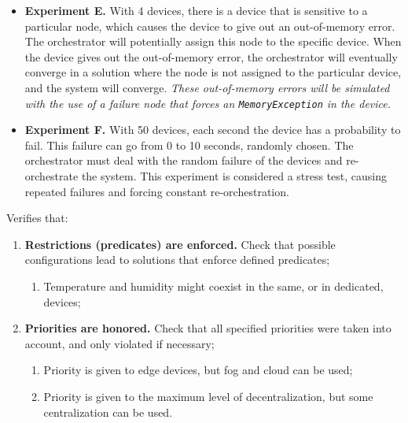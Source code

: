\begin{enumerate}
\begin{itemize}
            \item \textbf{Experiment E.} With 4 devices, there is a device that is sensitive to a particular node, which causes the device to give out an out-of-memory error. The orchestrator will potentially assign this node to the specific device. When the device gives out the out-of-memory error, the orchestrator will eventually converge in a solution where the node is not assigned to the particular device, and the system will converge.  \textit{These out-of-memory errors will be simulated with the use of a failure node that forces an \texttt{MemoryException} in the device.}
            \item \textbf{Experiment F.} With 50 devices, each second the device has a probability to fail. This failure can go from 0 to 10 seconds, randomly chosen. The orchestrator must deal with the random failure of the devices and re-orchestrate the system. This experiment is considered a stress test, causing repeated failures and forcing constant re-orchestration.
        \end{itemize}
        Verifies that:
        \begin{enumerate}
            \item \textbf{Restrictions (predicates) are enforced.} Check that possible configurations lead to solutions that enforce defined predicates;
                \begin{enumerate}
                    \item Temperature and humidity might coexist in the same, or in dedicated, devices;
                \end{enumerate}
            \item \textbf{Priorities are honored.} Check that all specified priorities were taken into account, and only violated if necessary;
                \begin{enumerate}
                    \item Priority is given to edge devices, but fog and cloud can be used;
                    \item Priority is given to the maximum level of decentralization, but some centralization can be used.
                \end{enumerate}
        \end{enumerate}
\end{enumerate}


